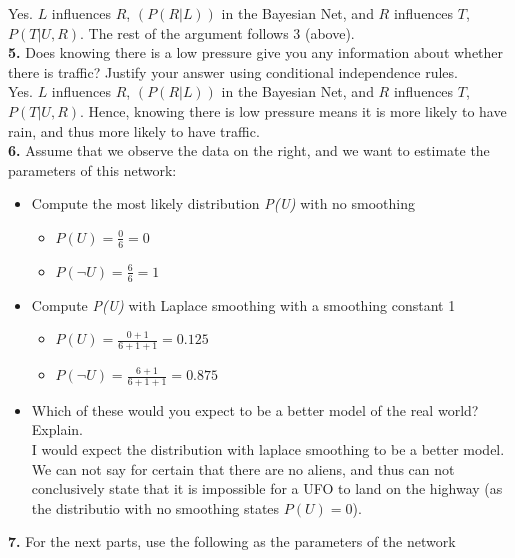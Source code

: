 \documentclass[titlepage]{article}
\begin{document}
Yes. $L$ influences $R$, $(P(R|L))$ in the Bayesian Net, and $R$ influences $T$, $P(T|U,R)$. The rest of the argument follows 3 (above).\\

\noindent \textbf{5. } Does knowing there is a low pressure give you any information about whether there is traffic? Justify your answer using conditional independence rules.\\

Yes. $L$ influences $R$, $(P(R|L))$ in the Bayesian Net, and $R$ influences $T$, $P(T|U,R)$. Hence, knowing there is low pressure means it is more likely to have rain, and thus more likely to have traffic.\\

\noindent \textbf{6. } Assume that we observe the data on the right, and we want to estimate the parameters of this network:
\begin{itemize}
	\item Compute the most likely distribution \textit{P(U)} with no smoothing
	\begin{itemize}
		\item $P(U) = \frac{0}{6} = 0$
		\item $P(\neg U) = \frac{6}{6} = 1$
	\end{itemize}
	\item Compute \textit{P(U)} with Laplace smoothing with a smoothing constant 1
	\begin{itemize}
		\item $P(U) = \frac{0+1}{6+1+1} = 0.125$
		\item $P(\neg U) = \frac{6+1}{6+1+1} = 0.875$
	\end{itemize}
	\item Which of these would you expect to be a better model of the real world? Explain.\\
		I would expect the distribution with laplace smoothing to be a better model. We can not say for certain that there are no aliens, and thus can not conclusively state that it is impossible for a UFO to land on the highway (as the distributio with no smoothing states $P(U)=0$).
\end{itemize}

\noindent \textbf{7. } For the next parts, use the following as the parameters of the network\\
\end{document}
